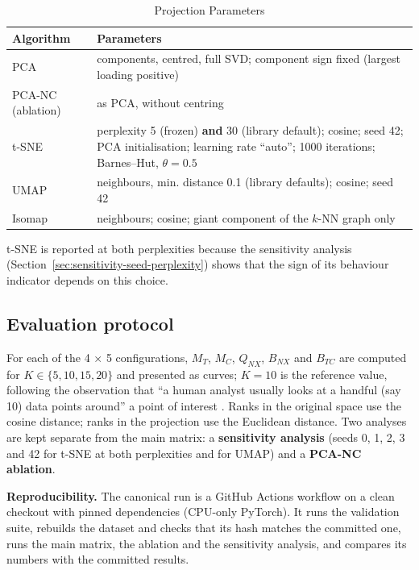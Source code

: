 \documentclass[conference,a4paper]{IEEEtran}
\begin{document}
\begin{table}[tp]
\centering
\caption{Projection Parameters}\label{tab:projection-parameters}
\footnotesize
\begin{tabularx}{\textwidth}{l>{\raggedright\arraybackslash}X}
\toprule
Algorithm & Parameters \\
\midrule
PCA & 3 components, centred, full SVD; component sign fixed (largest loading
positive) \\
PCA-NC (ablation) & as PCA, without centring \\
t-SNE & perplexity 5 (frozen) \textbf{and} 30 (library default); cosine; seed
42; PCA initialisation; learning rate ``auto''; 1000 iterations;
Barnes--Hut, \(\theta=0.5\) \\
UMAP & 15 neighbours, min. distance 0.1 (library defaults); cosine; seed 42 \\
Isomap & 15 neighbours; cosine; giant component of the \(k\)-NN graph only \\
\bottomrule
\end{tabularx}
\end{table}

t-SNE is reported at both perplexities because the sensitivity analysis
(Section~\ref{sec:sensitivity-seed-perplexity}) shows that the sign of its behaviour indicator
depends on this choice.

\subsection{Evaluation protocol}\label{sec:evaluation-protocol}

For each of the 4 × 5 configurations, \(M_T\), \(M_C\), \(Q_{NX}\),
\(B_{NX}\) and \(B_{TC}\) are computed for \(K \in \{5, 10, 15, 20\}\)
and presented as curves; \(K=10\) is the reference value, following the
observation that ``a human analyst usually looks at a handful (say 10)
data points around'' a point of interest \cite[p. 894]{r23}. Ranks in
the original space use the cosine distance; ranks in the projection use
the Euclidean distance. Two analyses are kept separate from the main
matrix: a \textbf{sensitivity analysis} (seeds 0, 1, 2, 3 and 42 for
t-SNE at both perplexities and for UMAP) and a \textbf{PCA-NC ablation}.

\textbf{Reproducibility.} The canonical run is a GitHub Actions workflow
on a clean checkout with pinned dependencies (CPU-only PyTorch). It runs
the validation suite, rebuilds the dataset and checks that its hash
matches the committed one, runs the main matrix, the ablation and the
sensitivity analysis, and compares its numbers with the committed
results.
\end{document}
